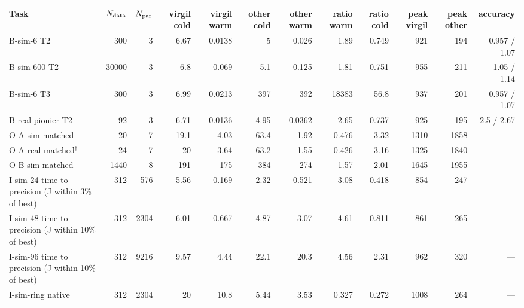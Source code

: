 \begin{tabular}{lrrrrrrrrrrr}
\hline
Task & $N_{\rm data}$ & $N_{\rm par}$ & virgil cold & virgil warm & other cold & other warm & ratio warm & ratio cold & peak virgil & peak other & accuracy \\
\hline
B-sim-6 T2 & 300 & 3 & 6.67 & 0.0138 & 5 & 0.026 & 1.89 & 0.749 & 921 & 194 & 0.957 / 1.07 \\
B-sim-600 T2 & 30000 & 3 & 6.8 & 0.069 & 5.1 & 0.125 & 1.81 & 0.751 & 955 & 211 & 1.05 / 1.14 \\
B-sim-6 T3 & 300 & 3 & 6.99 & 0.0213 & 397 & 392 & 18383 & 56.8 & 937 & 201 & 0.957 / 1.07 \\
B-real-pionier T2 & 92 & 3 & 6.71 & 0.0136 & 4.95 & 0.0362 & 2.65 & 0.737 & 925 & 195 & 2.5 / 2.67 \\
O-A-sim matched & 20 & 7 & 19.1 & 4.03 & 63.4 & 1.92 & 0.476 & 3.32 & 1310 & 1858 & --- \\
O-A-real matched$^\dagger$ & 24 & 7 & 20 & 3.64 & 63.2 & 1.55 & 0.426 & 3.16 & 1325 & 1840 & --- \\
O-B-sim matched & 1440 & 8 & 191 & 175 & 384 & 274 & 1.57 & 2.01 & 1645 & 1955 & --- \\
I-sim-24 time to precision (J within 3\% of best) & 312 & 576 & 5.56 & 0.169 & 2.32 & 0.521 & 3.08 & 0.418 & 854 & 247 & --- \\
I-sim-48 time to precision (J within 10\% of best) & 312 & 2304 & 6.01 & 0.667 & 4.87 & 3.07 & 4.61 & 0.811 & 861 & 265 & --- \\
I-sim-96 time to precision (J within 10\% of best) & 312 & 9216 & 9.57 & 4.44 & 22.1 & 20.3 & 4.56 & 2.31 & 962 & 320 & --- \\
I-sim-ring native & 312 & 2304 & 20 & 10.8 & 5.44 & 3.53 & 0.327 & 0.272 & 1008 & 264 & --- \\
\hline
\end{tabular}
